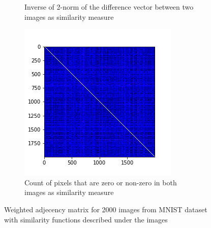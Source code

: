 \documentclass[10pt,a4paper, nocenter]{report}
\begin{document}
\begin{enumerate}
\begin{figure}[h]
\begin{center}
\begin{subfigure}[b]{0.3\textwidth}
                    \caption{Inverse of 2-norm of the difference vector between two images as similarity measure}
                    \label{fig:w_2norm}
                \end{subfigure}           
                \begin{subfigure}[b]{0.3\textwidth}
                    \centering
                    \includegraphics[width=\textwidth]{../../images/w_hamming.png}
                    \caption{Count of pixels that are zero or non-zero in both images as similarity measure}
                    \label{fig:w_hamming}
                \end{subfigure}           
            \end{center}
            \caption{Weighted adjecency matrix for 2000 images from MNIST dataset with similarity functions described under the images}
            \label{fig:mnistWImages}
        \end{figure}



\end{enumerate}
\end{document}
